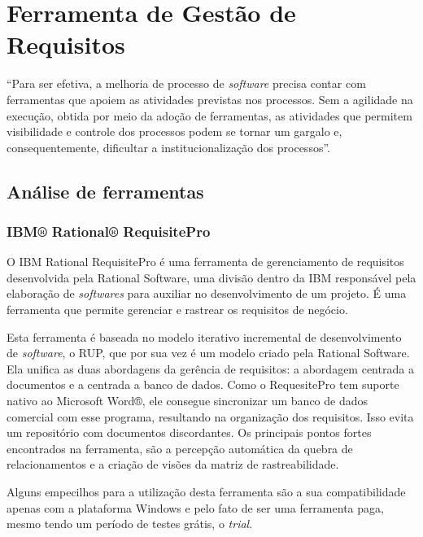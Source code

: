 \chapter{Ferramenta de Gestão de Requisitos}

“Para ser efetiva, a melhoria de processo de \textit{software} precisa contar com ferramentas que apoiem as atividades previstas nos processos. Sem a agilidade na execução, obtida por meio da adoção de ferramentas, as atividades que permitem visibilidade e controle dos processos podem se tornar um gargalo e, consequentemente, dificultar a institucionalização dos processos”.~\cite{mendes}

\section{Análise de ferramentas}

\subsection{IBM® Rational® RequisitePro}

O IBM Rational RequisitePro é uma ferramenta de gerenciamento de requisitos desenvolvida pela Rational Software, uma divisão dentro da IBM responsável pela elaboração de \textit{softwares} para auxiliar no desenvolvimento de um projeto. É uma ferramenta que permite gerenciar e rastrear os requisitos de negócio. 

Esta ferramenta é baseada no modelo iterativo incremental de desenvolvimento de \textit{software}, o RUP, que por sua vez é um modelo criado pela Rational Software. Ela unifica as duas abordagens da gerência de requisitos: a abordagem centrada a documentos e a centrada a banco de dados. Como o RequesitePro tem suporte nativo ao Microsoft Word®, ele consegue sincronizar um banco de dados comercial com esse programa, resultando na organização dos requisitos. Isso evita um repositório com documentos discordantes. Os principais pontos fortes encontrados na ferramenta, são a percepção automática da quebra de relacionamentos e a criação de visões da matriz de rastreabilidade. 

Alguns empecilhos para a utilização desta ferramenta são a sua compatibilidade apenas com a plataforma Windows e pelo fato de ser uma ferramenta paga, mesmo tendo um período de testes grátis, o \textit{trial}.

